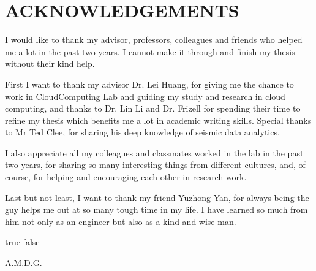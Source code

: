 %
%
%


\chapter*{ACKNOWLEDGEMENTS}

I would like to thank my advisor, professors, colleagues and friends who helped me a lot in the past two years. I cannot make it through and finish my thesis without their kind help.

First I want to thank my advisor Dr. Lei Huang, for giving me the chance to work in CloudComputing Lab and guiding my study and research in cloud computing, and thanks to Dr. Lin Li and Dr. Frizell for spending their time to refine my thesis which benefits me a lot in academic writing skills. Special thanks to Mr Ted Clee, for sharing his deep knowledge of seismic data analytics.

I also appreciate all my colleagues and classmates worked in the lab in the past two years, for sharing so many interesting things from different cultures, and, of course, for helping and encouraging each other in research work.

Last but not least, I want to thank my friend Yuzhong Yan, for always being the guy helps me out at so many tough time in my life. I have learned so much from him not only as an engineer but also as a kind and wise man. 

\pagebreak{}

\ifx true false
\vspace*{\fill}
\begin{center}
A.M.D.G.
\end{center}
\vspace*{\fill}
\pagebreak{}
\fi
